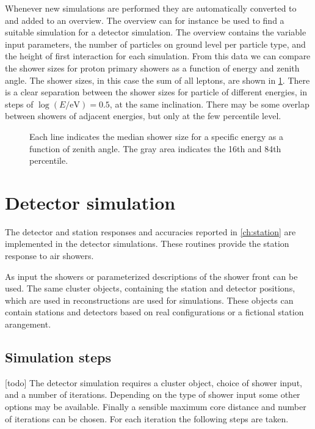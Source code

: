 Whenever new simulations are performed they are automatically converted to \hdf and added to an overview. The overview can for instance be used to find a suitable \corsika simulation for a detector simulation. The overview contains the variable input parameters, the number of particles on ground level per particle type, and the height of first interaction for each simulation. From this data we can compare the shower sizes for proton primary showers as a function of energy and zenith angle. The shower sizes, in this case the sum of all leptons, are shown in \cref{fig:simulations_shower_sizes}. There is a clear separation between the shower sizes for particle of different energies, in steps of $\log \left(E / {\si{\eV}}\right) = 0.5$, at the same inclination. There may be some overlap between showers of adjacent energies, but only at the few percentile level.

\begin{figure}
    \centering
    
    \caption{             Each line indicates the median shower size for a specific energy as a function of zenith angle. The gray area indicates the 16th and 84th percentile.}
    \label{fig:simulations_shower_sizes}
\end{figure}


\section{Detector simulation}

The detector and station responses and accuracies reported in \cref{ch:station} are implemented in the detector simulations. These routines provide the station response to air showers.

As input the \corsika showers or parameterized descriptions of the shower front can be used. The same cluster objects, containing the station and detector positions, which are used in reconstructions are used for simulations. These objects can contain stations and detectors based on real configurations or a fictional station arangement.


\subsection{Simulation steps}

[todo]
The detector simulation requires a cluster object, choice of shower input, and a number of iterations. Depending on the type of shower input some other options may be available. Finally a sensible maximum core distance and number of iterations can be chosen. For each iteration the following steps are taken.

